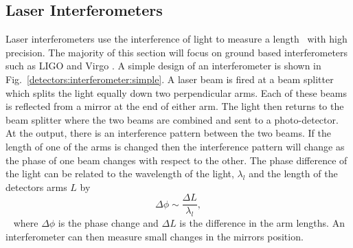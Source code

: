 \subsection{Laser Interferometers}

Laser interferometers use the interference of light to measure a
length~ with high precision.  The majority of this
section will focus on ground based interferometers such as \gls{LIGO} and Virgo
\citep{aasi2015AdvancedLIGO,acernese2015AdvancedVirgo}.  A simple design of an
interferometer is shown in Fig.~\ref{detectors:interferometer:simple}.  A laser
beam is fired at a beam splitter which splits the light equally down two
perpendicular arms.  Each of these beams is reflected from a mirror at the end
of either arm.  The light then returns to the beam splitter where the two beams
are combined and sent to a photo-detector.  At the output, there is an
interference pattern between the two beams.  If the length of one of the arms
is changed then the interference pattern will change as the phase of one beam
changes with respect to the other.  The phase difference of the light can be
related to the wavelength of the light, $\lambda_l$ and the length of the
detectors arms $L$ by~
%
\begin{equation}
\label{intro:detectors:phasechange}
\Delta \phi \sim \frac{\Delta L}{\lambda_l},
\end{equation}
%
~ where $\Delta
\phi$ is the phase change and $\Delta L$ is the difference in the arm lengths.
An interferometer can then measure small changes in the mirrors position.

